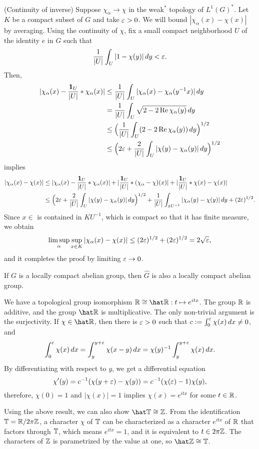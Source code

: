 \documentclass[a4paper]{article}
\begin{document}
\begin{pf}
(Continuity of inverse)
Suppose $\chi_\alpha\to\chi$ in the weak$^*$ topology of $L^1(G)^*$.
Let $K$ be a compact subset of $G$ and take $\varepsilon>0$.
We will bound $|\chi_\alpha(x)-\chi(x)|$ by averaging.
Using the continuity of $\chi$, fix a small compact neighborhood $U$ of the identity $e$ in $G$ such that
\[\frac1{|U|}\int_U|1-\chi(y)|\,dy<\varepsilon.\]
Then,
\begin{align*}
|\chi_\alpha(x)-\frac{\mathbf{1}_U}{|U|}*\chi_\alpha(x)|
&\le\frac1{|U|}\int_U|\chi_\alpha(x)-\chi_\alpha(y^{-1}x)|\,dy\\
&=\frac1{|U|}\int_U\sqrt{2-2\operatorname{Re} \chi_\alpha(y)}\,dy\\
&\le\Bigl(\frac1{|U|}\int_U(2-2\operatorname{Re}\chi_\alpha(y))\,dy\Bigr)^{1/2}\\
&\le\Bigl(2\varepsilon+\frac2{|U|}\int_U|\chi(y)-\chi_\alpha(y)|\,dy\Bigr)^{1/2}
\end{align*}
implies
\begin{align*}
|\chi_\alpha(x)-\chi(x)|
&\le|\chi_\alpha(x)-\frac{\mathbf{1}_U}{|U|}*\chi_\alpha(x)|+|\frac{\mathbf{1}_U}{|U|}*(\chi_\alpha-\chi)(x)|+|\frac{\mathbf{1}_U}{|U|}*\chi(x)-\chi(x)|\\
&\le\Bigl(2\varepsilon+\frac2{|U|}\int_U|\chi(y)-\chi_\alpha(y)|\,dy\Bigr)^{1/2}+\frac1{|U|}\int_{xU^{-1}}|\chi_\alpha(y)-\chi(y)|\,dy+(2\varepsilon)^{1/2}.
\end{align*}
Since $x\in$ is contained in $KU^{-1}$, which is compact so that it has finite measure, we obtain
\[\limsup_\alpha\sup_{x\in K}|\chi_\alpha(x)-\chi(x)|\le(2\varepsilon)^{1/2}+(2\varepsilon)^{1/2}=2\sqrt{\varepsilon},\]
and it completes the proof by limiting $\varepsilon\to0$.
\end{pf}
\begin{cor}
If $G$ is a locally compact abelian group, then $\hat G$ is also a locally compact abelian group.
\end{cor}

\begin{ex}
We have a topological group isomorphism $\R\cong\hat\R:t\mapsto e^{itx}$.
The group $\mathbb{R}$ is additive, and the group $\hat\R$ is multiplicative.
The only non-trivial argument is the surjectivity.
If $\chi\in\hat\R$, then there is $\varepsilon>0$ such that $c:=\int_0^\varepsilon\chi(x)\,dx\ne0$, and
\[\int_0^\varepsilon\chi(x)\,dx=\int_y^{y+\varepsilon}\chi(x-y)\,dx=\chi(y)^{-1}\int_y^{y+\varepsilon}\chi(x)\,dx.\]
By differentiating with respect to $y$, we get a differential equation
\[\chi'(y)=c^{-1}(\chi(y+\varepsilon)-\chi(y))=c^{-1}(\chi(\varepsilon)-1)\chi(y),\]
therefore, $\chi(0)=1$ and $|\chi(x)|=1$ implies $\chi(x)=e^{itx}$ for some $t\in\mathbb{R}$.
\end{ex}
\begin{ex}
Using the above result, we can also show $\hat\T\cong\Z$.
From the identification $\mathbb{T}=\mathbb{R}/2\pi\mathbb{Z}$, a character $\chi$ of $\mathbb{T}$ can be characterized as a character $e^{itx}$ of $\mathbb{R}$ that factors through $\mathbb{T}$, which means $e^{itx}=1$, and it is equivalent to $t\in2\pi\mathbb{Z}$.
The characters of $\mathbb{Z}$ is parametrized by the value at one, so $\hat\Z\cong\T$.
\end{ex}
\end{document}
